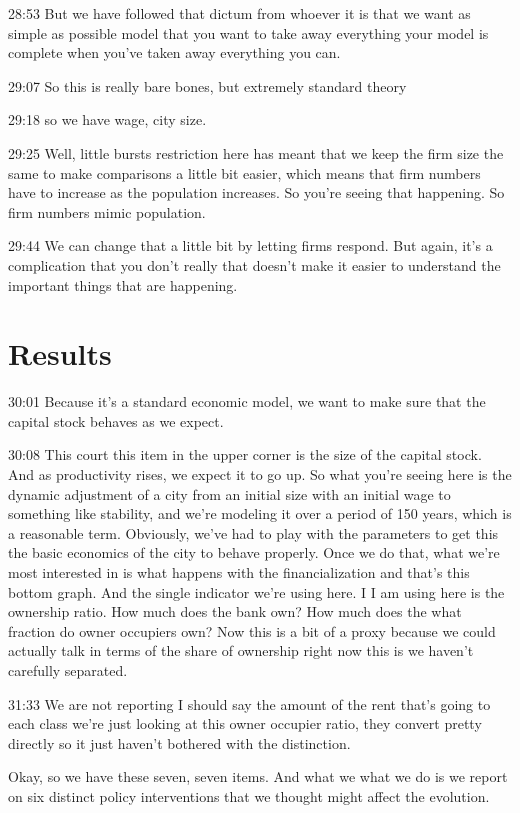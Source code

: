 \documentclass[]{article}
\begin{document}
28:53
But we have followed that dictum from whoever it is that we want as simple as possible model that you want to take away everything your model is complete when you've taken away everything you can.

29:07
So this is really bare bones, but extremely standard theory

29:18
so we have wage, city size.

29:25
Well, little bursts restriction here has meant that we keep the firm size the same to make comparisons a little bit easier, which means that firm numbers have to increase as the population increases. So you're seeing that happening. So firm numbers mimic population.

29:44
We can change that a little bit by letting firms respond. But again, it's a complication that you don't really that doesn't make it easier to understand the important things that are happening.


\section{Results}

30:01
Because it's a standard economic model, we want to make sure that the capital stock behaves as we expect.

30:08
This court this item in the upper corner is the size of the capital stock. And as productivity rises, we expect it to go up. So what you're seeing here is the dynamic adjustment of a city from an initial size with an initial wage to something like stability, and we're modeling it over a period of 150 years, which is a reasonable term. Obviously, we've had to play with the parameters to get this the basic economics of the city to behave properly. Once we do that, what we're most interested in is what happens with the financialization and that's this bottom graph. And the single indicator we're using here. I I am using here is the ownership ratio. How much does the bank own? How much does the what fraction do owner occupiers own? Now this is a bit of a proxy because we could actually talk in terms of the share of ownership right now this is we haven't carefully separated.

31:33
We are not reporting I should say the amount of the rent that's going to each class we're just looking at this owner occupier ratio, they convert pretty directly so it just haven't bothered with the distinction.

Okay, so we have these seven, seven items. And what we what we do is we report on six distinct policy interventions that we thought might affect the evolution.
\end{document}

